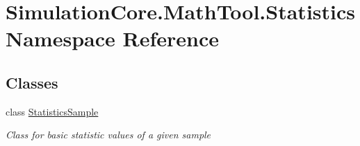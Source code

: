 \hypertarget{namespace_simulation_core_1_1_math_tool_1_1_statistics}{}\section{Simulation\+Core.\+Math\+Tool.\+Statistics Namespace Reference}
\label{namespace_simulation_core_1_1_math_tool_1_1_statistics}
\subsection*{Classes}
\begin{DoxyCompactItemize}
\item 
class \hyperlink{class_simulation_core_1_1_math_tool_1_1_statistics_1_1_statistics_sample}{Statistics\+Sample}
\begin{DoxyCompactList}\small\item\em Class for basic statistic values of a given sample \end{DoxyCompactList}\end{DoxyCompactItemize}
